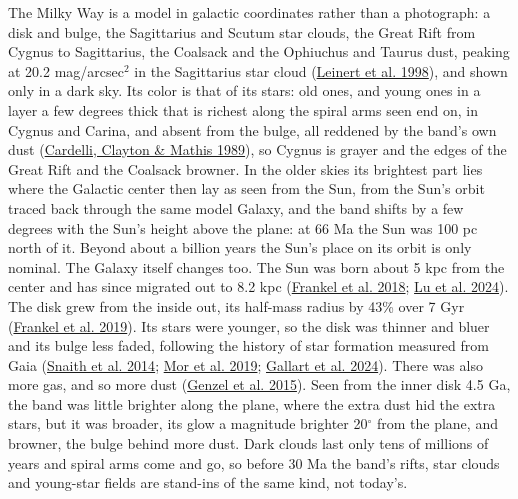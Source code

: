 \documentclass[9pt,twocolumn]{extarticle}
\begin{document}
The Milky Way is a model in galactic coordinates rather than a photograph: a disk and bulge, the Sagittarius and Scutum star clouds, the Great Rift from Cygnus to Sagittarius, the Coalsack and the Ophiuchus and Taurus dust, peaking at 20.2 mag/arcsec$^{2}$ in the Sagittarius star cloud (\protect\hyperlink{cite.leinert1998}{Leinert et al. 1998}), and shown only in a dark sky. Its color is that of its stars: old ones, and young ones in a layer a few degrees thick that is richest along the spiral arms seen end on, in Cygnus and Carina, and absent from the bulge, all reddened by the band's own dust (\protect\hyperlink{cite.cardelli1989}{Cardelli, Clayton \& Mathis 1989}), so Cygnus is grayer and the edges of the Great Rift and the Coalsack browner. In the older skies its brightest part lies where the Galactic center then lay as seen from the Sun, from the Sun's orbit traced back through the same model Galaxy, and the band shifts by a few degrees with the Sun's height above the plane: at 66 Ma the Sun was 100 pc north of it. Beyond about a billion years the Sun's place on its orbit is only nominal. The Galaxy itself changes too. The Sun was born about 5 kpc from the center and has since migrated out to 8.2 kpc (\protect\hyperlink{cite.frankel2018}{Frankel et al. 2018}; \protect\hyperlink{cite.lu2024}{Lu et al. 2024}). The disk grew from the inside out, its half-mass radius by 43\% over 7 Gyr (\protect\hyperlink{cite.frankel2019}{Frankel et al. 2019}). Its stars were younger, so the disk was thinner and bluer and its bulge less faded, following the history of star formation measured from Gaia (\protect\hyperlink{cite.snaith2014}{Snaith et al. 2014}; \protect\hyperlink{cite.mor2019}{Mor et al. 2019}; \protect\hyperlink{cite.gallart2024}{Gallart et al. 2024}). There was also more gas, and so more dust (\protect\hyperlink{cite.genzel2015}{Genzel et al. 2015}). Seen from the inner disk 4.5 Ga, the band was little brighter along the plane, where the extra dust hid the extra stars, but it was broader, its glow a magnitude brighter 20$^\circ$ from the plane, and browner, the bulge behind more dust. Dark clouds last only tens of millions of years and spiral arms come and go, so before 30 Ma the band's rifts, star clouds and young-star fields are stand-ins of the same kind, not today's.
\end{document}
